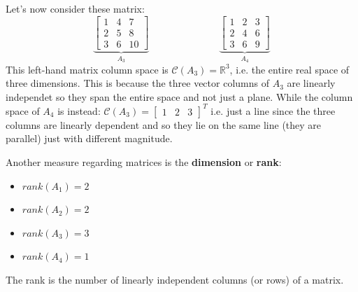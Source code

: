 Let's now consider these matrix:
\[
\underbrace{
\begin{bmatrix}
    1 & 4 & 7\\
    2 & 5 & 8\\
    3 & 6 & 10
\end{bmatrix}
}_{A_3} 
\hspace{3cm}
\underbrace{
\begin{bmatrix}
    1 & 2 & 3\\
    2 & 4 & 6\\
    3 & 6 & 9
\end{bmatrix}
}_{A_4} 
\]
This left-hand matrix column space is $\mathcal{C}(A_3) = \mathbb{R}^3$, i.e. the entire real space of three dimensions. This is because the three vector columns of $A_3$ are linearly independet so they span the entire space and not just a plane.
While the column space of $A_4$ is instead: $\mathcal{C}(A_3) = \begin{bmatrix}
    1&2&3
\end{bmatrix}^T$ i.e. just a line since the three columns are linearly dependent and so they lie on the same line (they are parallel) just with different magnitude.

Another measure regarding matrices is the \textbf{dimension} or \textbf{rank}:
\begin{itemize}
    \item $rank(A_1) = 2$
    \item $rank(A_2) = 2$
    \item $rank(A_3) = 3$
    \item $rank(A_4) = 1$
\end{itemize}
The rank is the number of linearly independent columns (or rows) of a matrix.

